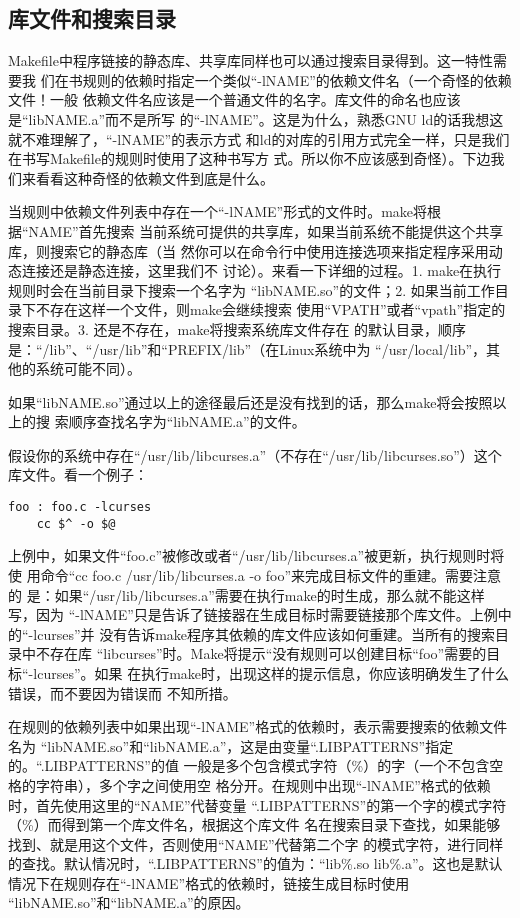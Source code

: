 \subsection{库文件和搜索目录}
Makefile中程序链接的静态库、共享库同样也可以通过搜索目录得到。这一特性需要我
们在书规则的依赖时指定一个类似“-lNAME”的依赖文件名（一个奇怪的依赖文件！一般
依赖文件名应该是一个普通文件的名字。库文件的命名也应该是“libNAME.a”而不是所写
的“-lNAME”。这是为什么，熟悉GNU ld的话我想这就不难理解了，“-lNAME”的表示方式
和ld的对库的引用方式完全一样，只是我们在书写Makefile的规则时使用了这种书写方
式。所以你不应该感到奇怪）。下边我们来看看这种奇怪的依赖文件到底是什么。

当规则中依赖文件列表中存在一个“-lNAME”形式的文件时。make将根据“NAME”首先搜索
当前系统可提供的共享库，如果当前系统不能提供这个共享库，则搜索它的静态库（当
然你可以在命令行中使用连接选项来指定程序采用动态连接还是静态连接，这里我们不
讨论）。来看一下详细的过程。1. make在执行规则时会在当前目录下搜索一个名字为
“libNAME.so”的文件；2. 如果当前工作目录下不存在这样一个文件，则make会继续搜索
使用“VPATH”或者“vpath”指定的搜索目录。3. 还是不存在，make将搜索系统库文件存在
的默认目录，顺序是：“/lib”、“/usr/lib”和“PREFIX/lib”（在Linux系统中为
“/usr/local/lib”，其他的系统可能不同）。

如果“libNAME.so”通过以上的途径最后还是没有找到的话，那么make将会按照以上的搜
索顺序查找名字为“libNAME.a”的文件。

假设你的系统中存在“/usr/lib/libcurses.a”（不存在“/usr/lib/libcurses.so”）这个
库文件。看一个例子：

\begin{Verbatim}[]
foo : foo.c -lcurses
    cc $^ -o $@
\end{Verbatim}

上例中，如果文件“foo.c”被修改或者“/usr/lib/libcurses.a”被更新，执行规则时将使
用命令“cc foo.c /usr/lib/libcurses.a -o foo”来完成目标文件的重建。需要注意的
是：如果“/usr/lib/libcurses.a”需要在执行make的时生成，那么就不能这样写，因为
“-lNAME”只是告诉了链接器在生成目标时需要链接那个库文件。上例中的“-lcurses”并
没有告诉make程序其依赖的库文件应该如何重建。当所有的搜索目录中不存在库
“libcurses”时。Make将提示“没有规则可以创建目标“foo”需要的目标“-lcurses”。如果
在执行make时，出现这样的提示信息，你应该明确发生了什么错误，而不要因为错误而
不知所措。

在规则的依赖列表中如果出现“-lNAME”格式的依赖时，表示需要搜索的依赖文件名为
“libNAME.so”和“libNAME.a”，这是由变量“.LIBPATTERNS”指定的。“.LIBPATTERNS”的值
一般是多个包含模式字符（\%）的字（一个不包含空格的字符串），多个字之间使用空
格分开。在规则中出现“-lNAME”格式的依赖时，首先使用这里的“NAME”代替变量
“.LIBPATTERNS”的第一个字的模式字符（\%）而得到第一个库文件名，根据这个库文件
名在搜索目录下查找，如果能够找到、就是用这个文件，否则使用“NAME”代替第二个字
的模式字符，进行同样的查找。默认情况时，“.LIBPATTERNS”的值为：“lib\%.so
lib\%.a”。这也是默认情况下在规则存在“-lNAME”格式的依赖时，链接生成目标时使用
“libNAME.so”和“libNAME.a”的原因。

